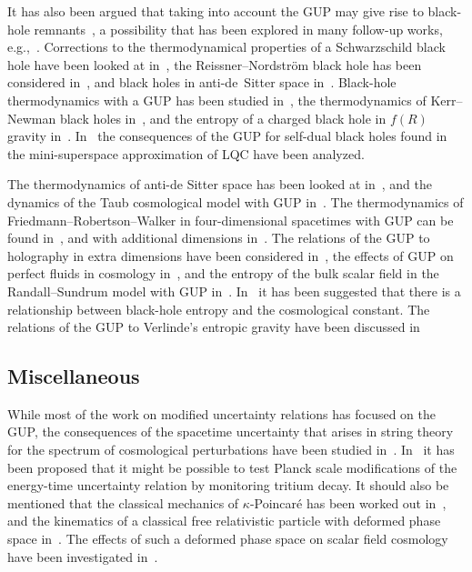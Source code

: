 \documentclass{article}
\begin{document}
It has also been argued that taking into account the GUP may give rise to black-hole 
remnants~\cite{Adler:2001vs}, a possibility that has been explored in many follow-up works, e.g.,~\cite{Chen:2002tu,Nozari:2005ah,Xiang:2009yq}. 
Corrections to the thermodynamical properties of a Schwarzschild black hole have been looked at  
in~\cite{AmelinoCamelia:2005ik,Zhao:2006xf,Dehghani:2011zzb,Majumder:2011xg,Majumder:2011bv}, the Reissner--Nordstr{\"o}m black hole has been considered in~\cite{Yoon:2007aj}, 
and black holes in anti-de~Sitter space in~\cite{Setare:2004sr,Setare:2005sj,Bolen:2004sq}. Black-hole thermodynamics with a 
{\sc GUP} has been studied in~\cite{Li:2002xb,Myung:2006qr,Bina:2010ir,Kim:2007hf}, the thermodynamics of 
Kerr--Newman black holes in~\cite{Xiang:2009yq}, and the entropy of a
charged black hole in $f(R)$ gravity in~\cite{Said:2011dg}. In~\cite{Carr:2011pr} the consequences of the {\sc GUP}
for self-dual black holes found in the mini-superspace approximation of LQC have been analyzed.

The thermodynamics of anti-de Sitter space has been looked at in~\cite{Vakili:2008tt}, and the dynamics of the
Taub cosmological model with {\sc GUP} in~\cite{Battisti:2007zg}. The thermodynamics of Friedmann--Robertson--Walker
in four-dimensional spacetimes with {\sc GUP} can be found in~\cite{Battisti:2007jd,Majumder:2011eg}, and with
additional dimensions in~\cite{Sefiedgar:2010we}.
The relations of the {\sc GUP} to holography in 
extra dimensions have been considered in~\cite{Scardigli:2003kr}, the effects of {\sc GUP} on perfect 
fluids in cosmology in~\cite{Majumder:2011ad}, and the entropy of the bulk scalar field in the Randall--Sundrum 
model with {\sc GUP} in~\cite{Kim:2006rx}. In~\cite{Garattini:2011aa} it has been suggested that there is a relationship between
black-hole entropy and the cosmological constant. The relations of the {\sc GUP} to Verlinde's entropic gravity 
have been discussed in~\cite{Nozari:2011gj}

\subsection{Miscellaneous}

While most of the work on modified uncertainty relations has  focused on the {\sc GUP}, 
the consequences of the spacetime uncertainty that arises in string theory for the spectrum of cosmological
perturbations have been studied in~\cite{Brandenberger:2002nq}. In~\cite{Raghavan:2009dk} it has been
proposed that it might be possible to test Planck scale modifications of the energy-time uncertainty relation by monitoring tritium decay. 
It should also be mentioned that
the classical mechanics of $\kappa$-Poincar\'e has been worked out in~\cite{Lukierski:1993wx}, and the
kinematics of a classical free relativistic particle with deformed phase space in~\cite{Girelli:2005dc,Ghosh:2006cb,Arzano:2010kz}.
The effects of such a deformed phase space on scalar field cosmology have been investigated in~\cite{PerezPayan:2011sq}.
\end{document}
